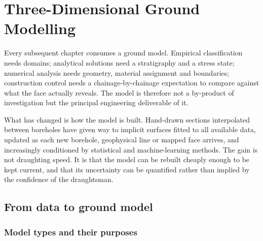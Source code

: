 \chapter{Three-Dimensional Ground Modelling}
\label{ch:ground-modelling}

Every subsequent chapter consumes a ground model. Empirical classification
needs domains; analytical solutions need a stratigraphy and a stress state;
numerical analysis needs geometry, material assignment and boundaries;
construction control needs a chainage-by-chainage expectation to compare
against what the face actually reveals. The model is therefore not a
by-product of investigation but the principal engineering deliverable of it.

What has changed is how the model is built. Hand-drawn sections interpolated
between boreholes have given way to implicit surfaces fitted to all available
data, updated as each new borehole, geophysical line or mapped face arrives,
and increasingly conditioned by statistical and machine-learning methods. The
gain is not draughting speed. It is that the model can be rebuilt cheaply
enough to be kept current, and that its uncertainty can be quantified rather
than implied by the confidence of the draughtsman.

\section{From data to ground model}
\label{sec:data-to-ground-model}

\subsection{Model types and their purposes}
\label{sec:model-types}


